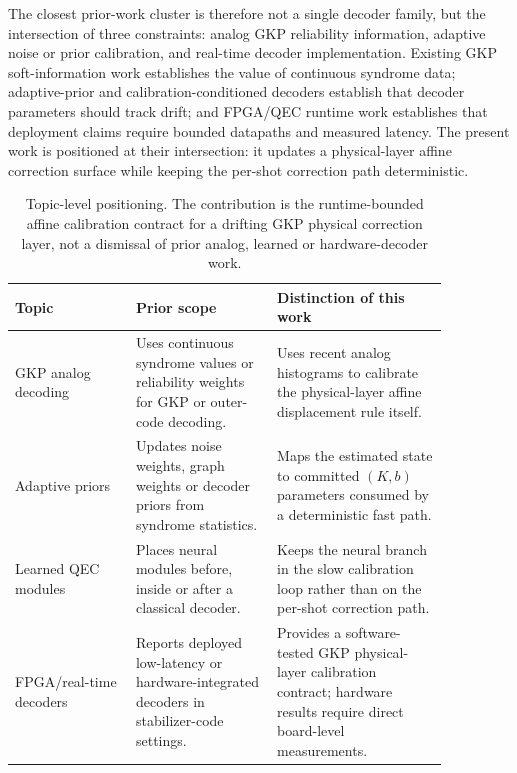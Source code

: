 \documentclass[11pt]{article}
\begin{document}
The closest prior-work cluster is therefore not a single decoder family, but
the intersection of three constraints: analog GKP reliability information,
adaptive noise or prior calibration, and real-time decoder implementation.
Existing GKP soft-information work establishes the value of continuous syndrome
data; adaptive-prior and calibration-conditioned decoders establish that
decoder parameters should track drift; and FPGA/QEC runtime work establishes
that deployment claims require bounded datapaths and measured latency.  The
present work is positioned at their intersection: it updates a physical-layer
affine correction surface while keeping the per-shot correction path
deterministic.

\begin{table}[t]
\centering
\small
\begin{tabular}{@{}>{\raggedright\arraybackslash}p{0.24\linewidth}>{\raggedright\arraybackslash}p{0.28\linewidth}>{\raggedright\arraybackslash}p{0.34\linewidth}@{}}
\toprule
Topic & Prior scope & Distinction of this work \\
\midrule
GKP analog decoding & Uses continuous syndrome values or reliability weights
for GKP or outer-code decoding. & Uses recent analog histograms to calibrate
the physical-layer affine displacement rule itself. \\
\addlinespace
Adaptive priors & Updates noise weights, graph weights or decoder priors from
syndrome statistics. & Maps the estimated state to committed \((K,b)\)
parameters consumed by a deterministic fast path. \\
\addlinespace
Learned QEC modules & Places neural modules before, inside or after a
classical decoder. & Keeps the neural branch in the slow calibration loop
rather than on the per-shot correction path. \\
\addlinespace
FPGA/real-time decoders & Reports deployed low-latency or hardware-integrated
decoders in stabilizer-code settings. & Provides a software-tested GKP
physical-layer calibration contract; hardware results require direct
board-level measurements. \\
\bottomrule
\end{tabular}
\caption{Topic-level positioning.  The contribution is the runtime-bounded
affine calibration contract for a drifting GKP physical correction layer, not
a dismissal of prior analog, learned or hardware-decoder work.}
\label{tab:related}
\end{table}
\end{document}
